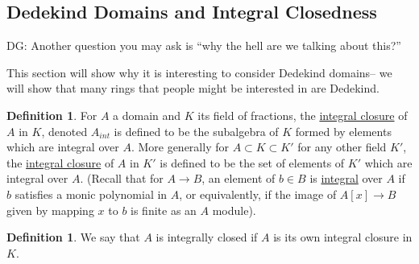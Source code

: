 \documentclass[12 pt]{article}
\theoremstyle{definition}
\newtheorem{defn}[thm]{Definition}
\renewcommand{\(}{\left(}
\renewcommand{\)}{\right)}
\begin{document}
\subsection{Dedekind Domains and Integral Closedness}

DG: Another question you may ask is ``why the hell are we talking about this?''

This section will show why it is interesting to consider Dedekind domains-- we will show that many rings that people might be interested in are Dedekind.


\begin{defn} For $A$ a domain and $K$ its field of fractions, the \uline{integral closure} of $A$ in $K$, denoted $A_{int}$ is defined to be the subalgebra of $K$ formed by elements which are integral over $A$. More generally for $A \subset K \subset K'$ for any other field $K'$, the \uline{integral closure} of $A$ in $K'$ is defined to be the set of elements of $K'$ which are integral over $A$. (Recall that for $A \to B$, an element of $b \in B$ is \uline{integral} over $A$ if $b$ satisfies a monic polynomial in $A$, or equivalently, if the image of $A[x] \to B$ given by mapping $x$ to $b$ is finite as an $A$ module).
\end{defn}



\begin{defn} We say that $A$ is integrally closed if $A$ is its own integral closure in $K$.
\end{defn}
\end{document}
